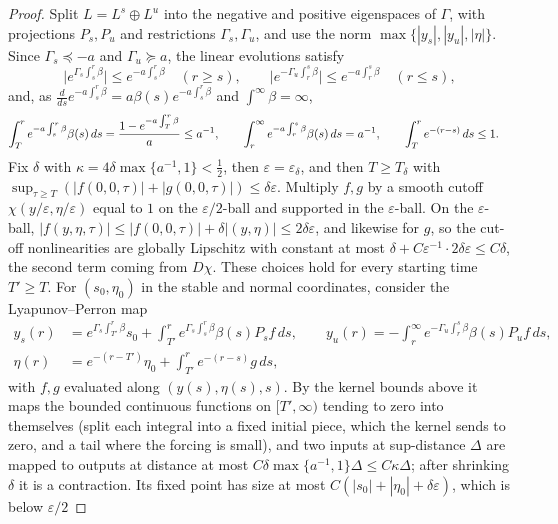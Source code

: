 \documentclass{article} %
\theoremstyle{plain}
\theoremstyle{definition}
\theoremstyle{remark}
\begin{document}
\begin{proof}
Split $L=L^s\oplus L^u$ into the negative and positive eigenspaces of $\Gamma$, with projections
$P_s,P_u$ and restrictions $\Gamma_s,\Gamma_u$, and use the norm $\max\{|y_s|,|y_u|,|\eta|\}$. Since
$\Gamma_s\preceq-a$ and $\Gamma_u\succeq a$, the linear evolutions satisfy
\[
\bigl|e^{\Gamma_s\int_s^r\beta}\bigr|\le e^{-a\int_s^r\beta}\quad(r\ge s),\qquad
\bigl|e^{-\Gamma_u\int_r^s\beta}\bigr|\le e^{-a\int_r^s\beta}\quad(r\le s),
\]
and, as $\frac{d}{ds}e^{-a\int_s^r\beta}=a\beta(s)e^{-a\int_s^r\beta}$ and $\int^\infty\beta=\infty$,
\begin{align*}
\int_T^re^{-a\int_s^r\beta}\beta(s)\,ds&=\frac{1-e^{-a\int_T^r\beta}}{a}\le a^{-1},\qquad
\int_r^\infty e^{-a\int_r^s\beta}\beta(s)\,ds=a^{-1},\qquad
\int_T^re^{-(r-s)}\,ds\le1 .
\end{align*}
Fix $\delta$ with $\kappa=4\delta\max\{a^{-1},1\}<\tfrac12$, then $\varepsilon=\varepsilon_\delta$, and
then $T\ge T_\delta$ with $\sup_{\tau\ge T}(|f(0,0,\tau)|+|g(0,0,\tau)|)\le\delta\varepsilon$.
Multiply $f,g$ by a smooth cutoff $\chi(y/\varepsilon,\eta/\varepsilon)$ equal to $1$ on the
$\varepsilon/2$-ball and supported in the $\varepsilon$-ball. On the $\varepsilon$-ball,
$|f(y,\eta,\tau)|\le|f(0,0,\tau)|+\delta|(y,\eta)|\le2\delta\varepsilon$, and likewise for $g$, so
the cut-off nonlinearities are globally Lipschitz with constant at most
$\delta+C\varepsilon^{-1}\cdot2\delta\varepsilon\le C\delta$, the second term coming from $D\chi$.
These choices hold for every starting time $T'\ge T$. For $(s_0,\eta_0)$ in the stable and normal
coordinates, consider the Lyapunov--Perron map
\begin{align*}
y_s(r)&=e^{\Gamma_s\int_{T'}^r\beta}s_0+\int_{T'}^re^{\Gamma_s\int_s^r\beta}\beta(s)P_sf\,ds,\qquad
y_u(r)=-\int_r^\infty e^{-\Gamma_u\int_r^s\beta}\beta(s)P_uf\,ds,\\
\eta(r)&=e^{-(r-T')}\eta_0+\int_{T'}^re^{-(r-s)}g\,ds ,
\end{align*}
with $f,g$ evaluated along $(y(s),\eta(s),s)$. By the kernel bounds above it maps the bounded
continuous functions on $[T',\infty)$ tending to zero into themselves (split each integral into a
fixed initial piece, which the kernel sends to zero, and a tail where the forcing is small), and two
inputs at sup-distance $\Delta$ are mapped to outputs at distance at most
$C\delta\max\{a^{-1},1\}\Delta\le C\kappa\Delta$; after shrinking $\delta$ it is a contraction. Its
fixed point has size at most $C(|s_0|+|\eta_0|+\delta\varepsilon)$, which is below $\varepsilon/2$

\end{proof}
\end{document}
